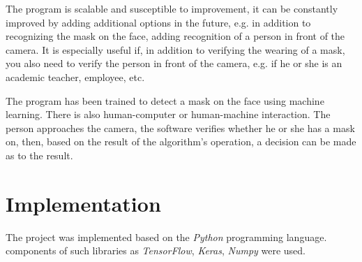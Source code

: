 \documentclass[12pt,a4paper]{article}
\begin{document}
The program is scalable and susceptible to improvement, it can be constantly improved by adding additional options in the future, e.g. in addition to recognizing the mask on the face, adding recognition of a person in front of the camera. It is especially useful if, in addition to verifying the wearing of a mask, you also need to verify the person in front of the camera, e.g. if he or she is an academic teacher, employee, etc.

The program has been trained to detect a mask on the face using machine learning. There is also human-computer or human-machine interaction. The person approaches the camera, the software verifies whether he or she has a mask on, then, based on the result of the algorithm's operation, a decision can be made as to the result. 
\newpage

\section{Implementation}
The project was implemented based on the \textit{Python} programming language. components of such libraries as \textit{TensorFlow}, \textit{Keras}, \textit{Numpy} were used. 
\end{document}
